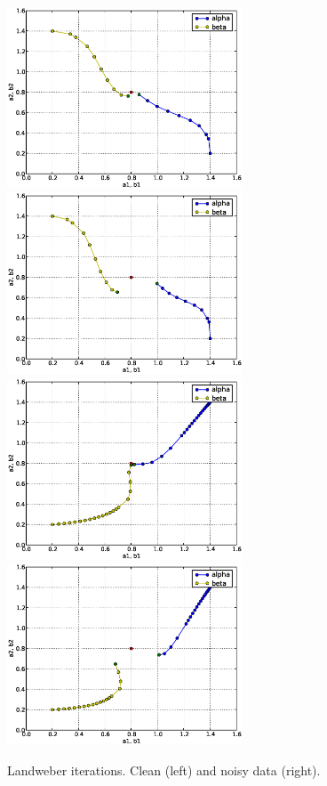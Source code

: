 \begin{figure}
\begin{center}
    \includegraphics[width=7cm]{chapters/schroll/eps/4D-1scan3.eps}
    \includegraphics[width=7cm]{chapters/schroll/eps/4D-1scan3-5.eps}
    \includegraphics[width=7cm]{chapters/schroll/eps/4D-1scan4.eps}
    \includegraphics[width=7cm]{chapters/schroll/eps/4D-1scan4-5.eps}
    \end{center}
    \vspace{-0.7cm}
  \caption{Landweber iterations. Clean (left) and noisy data (right). \label{fig5}}
\end{figure}

